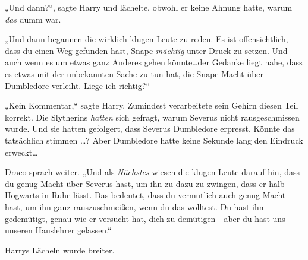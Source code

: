 „Und dann?“, sagte Harry und lächelte, obwohl er keine Ahnung hatte, warum \emph{das} dumm war.

„Und dann begannen die wirklich klugen Leute zu reden. Es ist offensichtlich, dass du einen Weg gefunden hast, Snape \emph{mächtig} unter Druck zu setzen. Und auch wenn es um etwas ganz Anderes gehen könnte…der Gedanke liegt nahe, dass es etwas mit der unbekannten Sache zu tun hat, die Snape Macht über Dumbledore verleiht. Liege ich richtig?“

„Kein Kommentar,“ sagte Harry. Zumindest verarbeitete sein Gehirn diesen Teil korrekt. Die Slytherins \emph{hatten} sich gefragt, warum Severus nicht rausgeschmissen wurde. Und sie hatten gefolgert, dass Severus Dumbledore erpresst. Könnte das tatsächlich stimmen …? Aber Dumbledore hatte keine Sekunde lang den Eindruck erweckt…

Draco sprach weiter. „Und als \emph{Nächstes} wiesen die klugen Leute darauf hin, dass du genug Macht über Severus hast, um ihn zu dazu zu zwingen, dass er halb Hogwarts in Ruhe lässt. Das bedeutet, dass du vermutlich auch genug Macht hast, um ihn ganz rauszuschmeißen, wenn du das wolltest. Du hast ihn gedemütigt, genau wie er versucht hat, dich zu demütigen—aber du hast uns unseren Hauslehrer gelassen.“

Harrys Lächeln wurde breiter.

